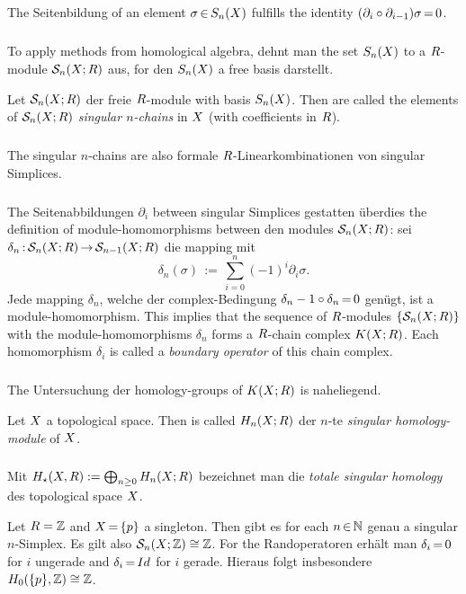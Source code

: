 \documentclass[11pt,twoside]{article}
\def\Rand#1{\delta_#1}
\begin{document}
\subparagraph{}
The Seitenbildung of an element $ \sigma {\,\in\,} S_n(X)$ fulfills the identity
$(\partial_i \circ \partial_{i-1}) \sigma {\,=\,} 0$.

\subparagraph{}
To apply methods from homological algebra,
dehnt man the set $S_n(X)$ to a $R$-module ${\mathcal{S}}_n(X;R)$ aus,
for den $S_n(X)$ a free basis darstellt.

\begin{definition}
Let ${\mathcal{S}}_n(X;R)$ der freie $R$-module with basis $S_n(X)$.
Then are called the elements of ${\mathcal{S}}_n(X;R)$ \textit{singular $n$-chains}
in $X$ (with coefficients in $R$).
\end{definition}

\subparagraph{}
The singular $n$-chains are also formale $R$-Linearkombinationen von
singular Simplices.

\subparagraph{}
The Seitenabbildungen $\partial_i$ between singular Simplices
gestatten \"uberdies the definition of module-homomorphisms
between den modules ${\mathcal{S}}_n(X;R)$:
sei $\Rand{n} \: \cal{S}_n(\topX;\riR) \xto \cal{S}_{n-1}(\topX;\riR)$
die mapping mit
\[
\Rand{n}(\sigma) \, := \, \sum_{i=0}^n (-1)^i \partial_i \sigma.
\]
Jede mapping $\Rand{n}$,
welche der complex-Bedingung $\Rand{n-1} \circ \Rand{n} \eq 0$ gen\"ugt,
ist a module-homomorphism.
This implies
that the sequence of $R$-modules $\{{\mathcal{S}}_n(X;R)\}$ with the
module-homomorphisms $\Rand{n}$ forms a $R$-chain complex $K(X;R)$.
Each homomorphism $\Rand{i}$ is called a \textit{boundary operator}
of this chain complex.

\subparagraph{}
The Untersuchung der homology-groups of $K(X;R)$ is naheliegend.

\begin{definition}
Let $X$ a topological space.
Then is called $H_n(X;R)$ der $n$-te \textit{singular homology-module} of $X$.
\end{definition}

\subparagraph{}
Mit $H_{\star}(X,R) := \bigoplus_{n \geq 0} H_n(X;R)$ bezeichnet man die
\textit{totale singular homology} des topological space $X$.

\begin{example}
Let $R={\mathbb{Z}}$ and $X {\,=\,} \{p\}$ a singleton.
Then gibt es for each $n {\,\in\,} {\mathbb{N}}$ genau a singular $n$-Simplex.
Es gilt also ${\mathcal{S}}_n(X;{\mathbb{Z}}) \cong {\mathbb{Z}}$.
For the Randoperatoren erh\"alt man $\Rand{i} \eq 0$ for $i$ ungerade and
$\Rand{i} \eq Id$ for $i$ gerade.
Hieraus folgt insbesondere $H_0(\{p\},{\mathbb{Z}}) \cong {\mathbb{Z}}$.
\end{example}
\end{document}
